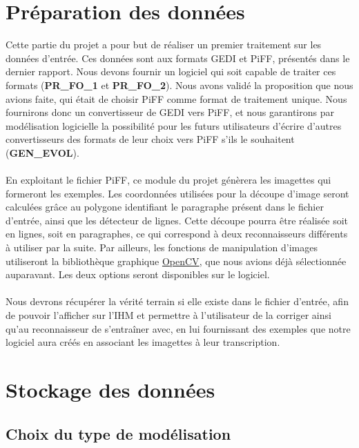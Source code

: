 \section{Préparation des données}

Cette partie du projet a pour but de réaliser un premier traitement sur les
données d’entrée. Ces données sont aux formats GEDI et PiFF, présentés dans
le dernier rapport. Nous devons fournir un logiciel qui soit capable de
traiter ces formats (\textbf{PR\_FO\_1} et \textbf{PR\_FO\_2}). Nous avons validé
la proposition que nous avions faite, qui était de choisir PiFF comme format
de traitement unique. Nous fournirons donc un convertisseur de GEDI vers PiFF,
et nous garantirons par modélisation logicielle la possibilité pour les futurs
utilisateurs d’écrire d’autres convertisseurs des formats de leur choix vers
PiFF s’ils le souhaitent (\textbf{GEN\_EVOL}).

\paragraph{}
En exploitant le fichier PiFF, ce module du projet génèrera les imagettes qui
formeront les exemples. Les coordonnées utilisées pour la découpe d’image seront
calculées grâce au polygone identifiant le paragraphe présent dans le fichier
d’entrée, ainsi que les détecteur de lignes. Cette découpe pourra être réalisée
soit en lignes, soit en paragraphes, ce qui correspond à deux reconnaisseurs
différents à utiliser par la suite. Par ailleurs, les fonctions de manipulation
d’images utiliseront la bibliothèque graphique \href{https://opencv.org}{OpenCV},
que nous avions déjà sélectionnée auparavant. Les deux options seront
disponibles sur le logiciel.

\paragraph{}
Nous devrons récupérer la vérité terrain si elle existe dans le fichier d’entrée,
afin de pouvoir l’afficher sur l’IHM et permettre à l’utilisateur de la corriger
ainsi qu’au reconnaisseur de s’entraîner avec, en lui fournissant des exemples
que notre logiciel aura créés en associant les imagettes à leur transcription.

\section{Stockage des données}

\subsection{Choix du type de modélisation}

